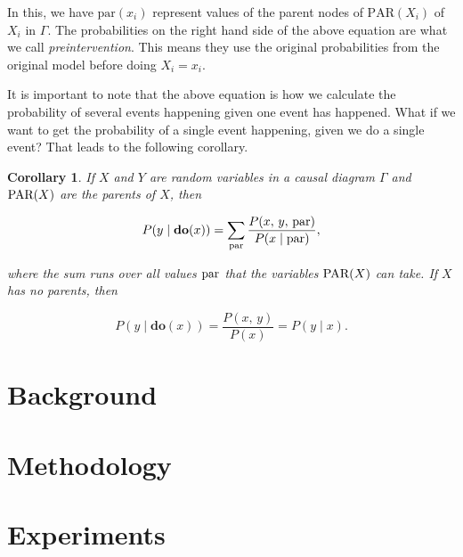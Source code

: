 \documentclass{article}
\newtheorem{corollary}{Corollary}[theorem]
\begin{document}
In this, we have $\text{par}(x_i)$ represent values of the parent nodes of $\text{PAR}(X_i)$ of $X_i$ in $\Gamma$.
The probabilities on the right hand side of the above equation are what we call \textit{preintervention}. 
This means they use the original probabilities from the original model before doing $X_i = x_i$.

It is important to note that the above equation is how we calculate the probability of several events 
happening given one event has happened. What if we want to get the probability of a single event happening, 
given we do a single event? That leads to the following corollary.

\begin{corollary}
    If $X$ and $Y$ are random variables in a causal diagram $\Gamma$ and $\textup{PAR}(X)$ are the parents of $X$, then

    \[P(y\;|\;  \textbf{do}(x)) = \sum_{\textup{par}}\frac{P(x,\,y,\,\textup{par})}{P(x\;|\; \textup{par})},\]

    where the sum runs over all values $\textup{par}$ that the variables $\textup{PAR}(X)$ can take. If $X$ has no parents, then

    \[P(y\;|\; \textbf{do}(x)) = \frac{P(x,\,y)}{P(x)} = P(y\;|\; x).\]
\end{corollary}



\section{Background}


\section{Methodology}


\section{Experiments}

\end{document}
